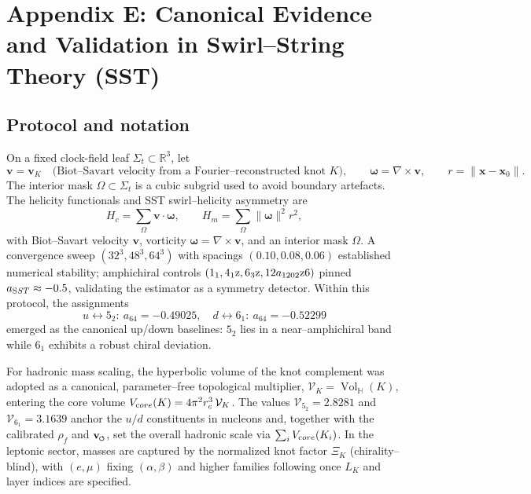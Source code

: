 \documentclass[smallextended]{svjour3}       %
\newcommand{\swirlarrow}{%
	\mathchoice{\mkern-2mu\scriptstyle\boldsymbol{\circlearrowleft}}%
	{\mkern-2mu\scriptstyle\boldsymbol{\circlearrowleft}}%
	{\mkern-2mu\scriptscriptstyle\boldsymbol{\circlearrowleft}}%
	{\mkern-2mu\scriptscriptstyle\boldsymbol{\circlearrowleft}}%
}
\newcommand{\Vol}{\operatorname{Vol}}   %
\newcommand{\rhof}{\rhoF}               %
\newcommand{\vswirl}{\mathbf{v}_{\swirlarrow}}
\newcommand{\rhoF}{\rho_{\!f}}      %
\begin{document}
\section*{Appendix E: Canonical Evidence and Validation in Swirl--String Theory (SST)}
\label{sec:canon-validation}

    \subsection{Protocol and notation}
    On a fixed clock-field leaf \(\Sigma_t\subset\mathbb{R}^3\), let
    \[
    \mathbf v=\mathbf v_K \quad\text{(Biot--Savart velocity from a Fourier–reconstructed knot \(K\))},\qquad
    \boldsymbol\omega=\nabla\times\mathbf v,\qquad
    r=\|\mathbf x-\mathbf x_0\|.
    \]
    The interior mask \(\Omega\subset\Sigma_t\) is a cubic subgrid used to avoid boundary artefacts. The helicity functionals and SST swirl–helicity asymmetry are
    \[
    H_c=\sum_{\Omega}\mathbf v\!\cdot\!\boldsymbol\omega,\qquad
    H_m=\sum_{\Omega}\|\boldsymbol\omega\|^2 r^2,
    \]
    with Biot–Savart velocity \(\mathbf v\), vorticity \(\boldsymbol{\omega}=\nabla\times\mathbf v\), and an interior mask \(\Omega\). A convergence sweep \((32^3,48^3,64^3)\) with spacings \((0.10,0.08,0.06)\) established numerical stability; amphichiral controls \((1_1,4_1{\textrm z},6_3{\textrm z},12a_{1202}\textrm{z6})\) pinned \(a_{\textrm SST}\approx-0.5\), validating the estimator as a symmetry detector. Within this protocol, the assignments
    \[
    u \leftrightarrow 5_2:\ a_{64}=-0.49025,\quad
    d \leftrightarrow 6_1:\ a_{64}=-0.52299
    \]
    emerged as the canonical up/down baselines: \(5_2\) lies in a near–amphichiral band while \(6_1\) exhibits a robust chiral deviation.

    For hadronic mass scaling, the hyperbolic volume of the knot complement was adopted as a canonical, parameter–free topological multiplier,
    \(\mathcal{V}_K=\Vol_{\!\mathbb{H}}(K)\), entering the core volume \(V_{\textrm core}(K)=4\pi^2 r_c^3\,\mathcal{V}_K\).
    The values \(\mathcal{V}_{5_2}=2.8281\) and \(\mathcal{V}_{6_1}=3.1639\) anchor the \(u/d\) constituents in nucleons and, together with the calibrated \(\rhof\) and \(\vswirl\), set the overall hadronic scale via \(\sum_i V_{\textrm core}(K_i)\).
    In the leptonic sector, masses are captured by the normalized knot factor \(\Xi_K\) (chirality–blind), with \((e,\mu)\) fixing \((\alpha,\beta)\) and higher families following once \(L_K\) and layer indices are specified.
\end{document}
